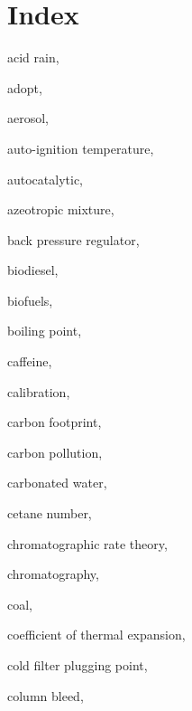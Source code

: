 
\chapter{Index} %



\begin{theindex}
  
  \item \lowercase {acid rain}, 
  \item \lowercase {adopt}, 
  \item \lowercase {aerosol}, 
  \item \lowercase {auto-ignition temperature}, 
  \item \lowercase {autocatalytic}, 
  \item \lowercase {azeotropic mixture}, 
  \item \lowercase {back pressure regulator}, 
  \item \lowercase {biodiesel}, 
  \item \lowercase {biofuels}, 
  \item \lowercase {boiling point}, 
  \item \lowercase {caffeine}, 
  \item \lowercase {calibration}, 
  \item \lowercase {carbon footprint}, 
  \item \lowercase {carbon pollution}, 
  \item \lowercase {carbonated water}, 
  \item \lowercase {cetane number}, 
  \item \lowercase {chromatographic rate theory}, 
  \item \lowercase {chromatography}, 
  \item \lowercase {coal}, 
  \item \lowercase {coefficient of thermal expansion}, 
  \item \lowercase {cold filter plugging point}, 
  \item \lowercase {column bleed}, 

\end{theindex}
